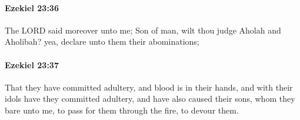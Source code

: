 		\paragraph{Ezekiel 23:36} %
			\label{EZEKIEL-23-36}

			The LORD said moreover unto me; Son of man, wilt thou judge Aholah and Aholibah? yea, declare unto them their abominations;


		\paragraph{Ezekiel 23:37} %
			\label{EZEKIEL-23-37}

			That they have committed adultery, and blood is in their hands, and with their idols have they committed adultery, and have also caused their sons, whom they bare unto me, to pass for them through the fire, to devour them.



